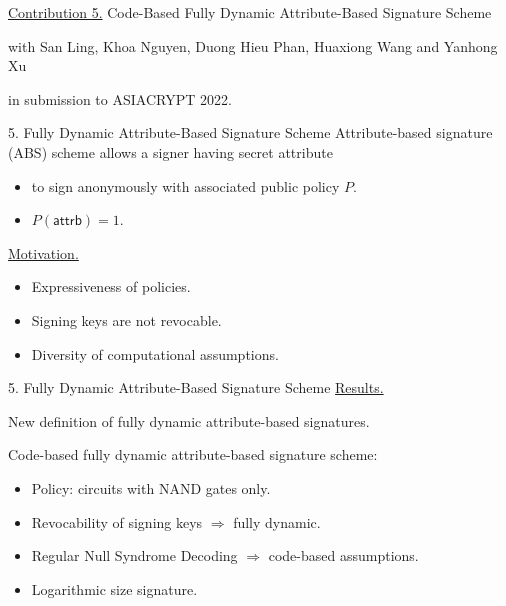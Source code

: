 \begin{frame}
	\underline{Contribution 5.} Code-Based Fully Dynamic Attribute-Based Signature Scheme
	
	{\small with San Ling, Khoa Nguyen, Duong Hieu Phan, Huaxiong Wang and Yanhong Xu}
	
	in submission to ASIACRYPT 2022.
\end{frame}

\begin{frame}{5. Fully Dynamic Attribute-Based Signature Scheme}
	Attribute-based signature (ABS) scheme allows a signer having secret attribute\pause
	\begin{itemize}
		\item to sign anonymously with associated public policy $P$.\pause
		\item $P(\textsf{attrb}) = 1$.\pause
	\end{itemize}
	
	\underline{Motivation.}\pause
	\begin{itemize}
		\item Expressiveness of policies.\pause
		\item Signing keys are not revocable.\pause
		\item Diversity of computational assumptions.
	\end{itemize}
\end{frame}

\begin{frame}{5. Fully Dynamic Attribute-Based Signature Scheme}
	\underline{Results.} \pause
	
	New definition of fully dynamic attribute-based signatures.\pause
	
	Code-based fully dynamic attribute-based signature scheme:\pause
	\begin{itemize}
		\item Policy: circuits with NAND gates only.\pause
		\item Revocability of signing keys $\Rightarrow$ fully dynamic.\pause
		\item Regular Null Syndrome Decoding $\Rightarrow$ code-based assumptions.\pause
		\item Logarithmic size signature.
	\end{itemize}
\end{frame}

